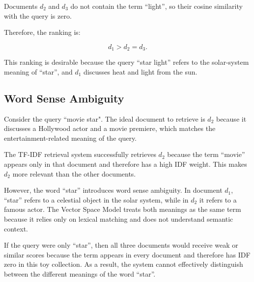 Documents $d_2$ and $d_3$ do not contain the term ``light'', so their cosine
similarity with the query is zero.

Therefore, the ranking is:

\[
d_1 > d_2 = d_3.
\]

This ranking is desirable because the query ``star light'' refers to the
solar-system meaning of ``star'', and $d_1$ discusses heat and light from the
sun.

\subsection{Word Sense Ambiguity}

Consider the query ``movie star". The ideal document to retrieve is $d_2$
because it discusses a Hollywood actor and a movie premiere, which matches
the entertainment-related meaning of the query.

The TF-IDF retrieval system successfully retrieves $d_2$ because the term
``movie'' appears only in that document and therefore has a high IDF weight.
This makes $d_2$ more relevant than the other documents.

However, the word ``star'' introduces word sense ambiguity. In document
$d_1$, ``star'' refers to a celestial object in the solar system, while in
$d_2$ it refers to a famous actor. The Vector Space Model treats both meanings
as the same term because it relies only on lexical matching and does not
understand semantic context.

If the query were only ``star'', then all three documents would receive weak
or similar scores because the term appears in every document and therefore has
IDF zero in this toy collection. As a result, the system cannot effectively
distinguish between the different meanings of the word ``star''.
